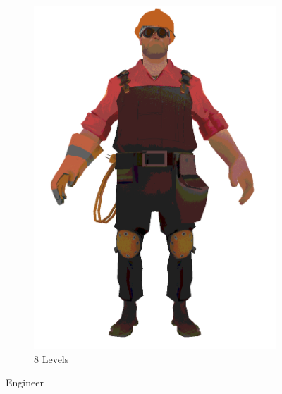 \begin{figure}[h]
\begin{subfigure}[b]{0.2\textwidth}
        \includegraphics[width=\textwidth]{img/textures/CelShadeTexture8.png}
        \caption{8 Levels}
        \label{fig:CelShadeTexture8}
    \end{subfigure}
    \caption{Engineer}
    \label{fig:TexturesEngineer}
\end{figure}

